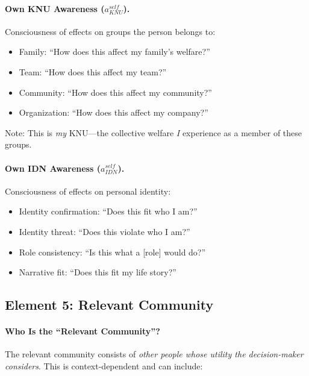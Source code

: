 \paragraph{Own KNU Awareness ($a^{self}_{KNU}$).}
Consciousness of effects on groups the person belongs to:

\begin{itemize}
\item Family: ``How does this affect my family's welfare?''
\item Team: ``How does this affect my team?''
\item Community: ``How does this affect my community?''
\item Organization: ``How does this affect my company?''
\end{itemize}

Note: This is \emph{my} KNU---the collective welfare \emph{I} experience 
as a member of these groups.

\paragraph{Own IDN Awareness ($a^{self}_{IDN}$).}
Consciousness of effects on personal identity:

\begin{itemize}
\item Identity confirmation: ``Does this fit who I am?''
\item Identity threat: ``Does this violate who I am?''
\item Role consistency: ``Is this what a [role] would do?''
\item Narrative fit: ``Does this fit my life story?''
\end{itemize}

\subsection{Element 5: Relevant Community}
\label{subsec:relevant-community}

\paragraph{Who Is the ``Relevant Community''?}
The relevant community consists of \emph{other people whose utility the 
decision-maker considers}. This is context-dependent and can include:

